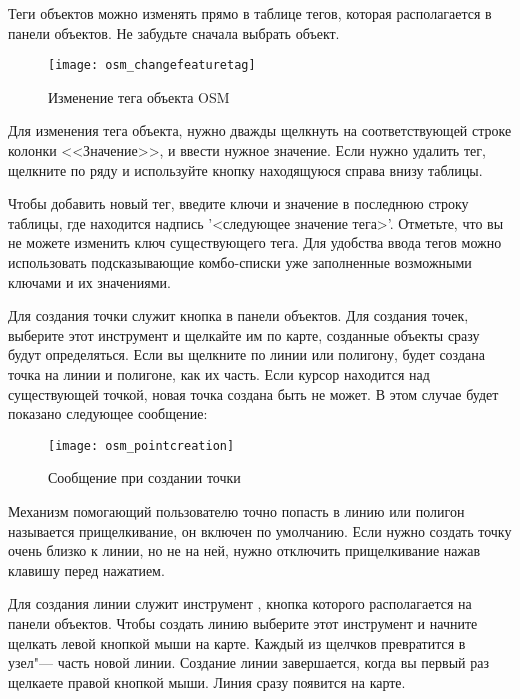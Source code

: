
Теги объектов можно изменять прямо в таблице тегов, которая
располагается в панели объектов. Не забудьте сначала выбрать объект.

\begin{figure}[ht]
   \centering
   \texttt{[image: osm\_changefeaturetag]}
   \caption{Изменение тега объекта OSM \nixcaption}\label{fig:osmchfeattag}
\end{figure}

Для изменения тега объекта, нужно дважды щелкнуть на соответствующей
строке колонки <<Значение>>, и ввести нужное значение. Если нужно удалить
тег, щелкните по ряду и используйте кнопку 
находящуюся справа внизу таблицы.

Чтобы добавить новый тег, введите ключи и значение в последнюю строку
таблицы, где находится надпись '<следующее значение тега>'. Отметьте,
что вы не можете изменить ключ существующего тега. Для удобства ввода
тегов можно использовать подсказывающие комбо-списки уже заполненные
возможными ключами и их значениями.


Для создания точки служит кнопка 
в панели объектов. Для создания точек, выберите этот инструмент и
щелкайте им по карте, созданные объекты сразу будут определяться. Если
вы щелкните по линии или полигону, будет создана точка на линии и
полигоне, как их часть. Если курсор находится над существующей точкой,
новая точка создана быть не может. В этом случае будет показано
следующее сообщение:

\begin{figure}[ht]
   \centering
   \texttt{[image: osm\_pointcreation]}
   \caption{Сообщение при создании точки \nixcaption}\label{fig:osmpoicreat}
\end{figure}

Механизм помогающий пользователю точно попасть в линию или полигон
называется прищелкивание, он включен по умолчанию. Если нужно создать
точку очень близко к линии, но не на ней, нужно отключить прищелкивание
нажав клавишу  перед нажатием.


Для создания линии служит инструмент ,
кнопка которого располагается на панели объектов. Чтобы создать линию
выберите этот инструмент и начните щелкать левой кнопкой мыши на карте.
Каждый из щелчков превратится в узел"--- часть новой линии. Создание
линии завершается, когда вы первый раз щелкаете правой кнопкой мыши.
Линия сразу появится на карте.

